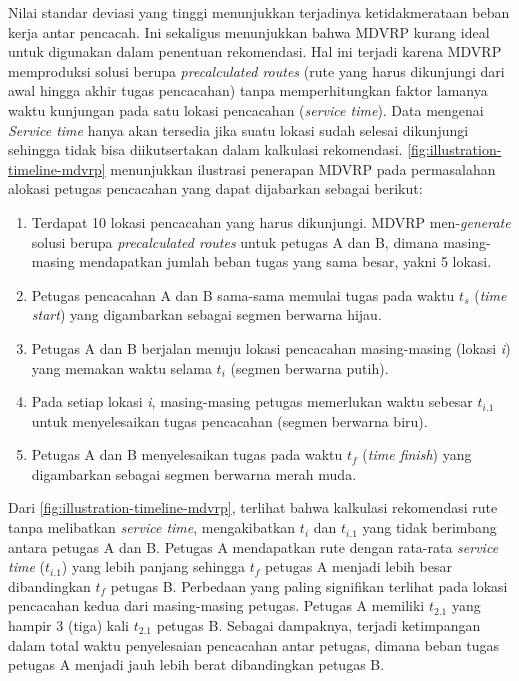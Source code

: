 Nilai standar deviasi yang tinggi menunjukkan terjadinya ketidakmerataan beban kerja antar pencacah. Ini sekaligus menunjukkan bahwa MDVRP kurang ideal untuk digunakan dalam penentuan rekomendasi. Hal ini terjadi karena MDVRP memproduksi solusi berupa \textit{precalculated routes} (rute yang harus dikunjungi dari awal hingga akhir tugas pencacahan) tanpa memperhitungkan faktor lamanya waktu kunjungan pada satu lokasi pencacahan (\textit{service time}). Data mengenai \textit{Service time} hanya akan tersedia jika suatu lokasi sudah selesai dikunjungi sehingga tidak bisa diikutsertakan dalam kalkulasi rekomendasi. \autoref{fig:illustration-timeline-mdvrp} menunjukkan ilustrasi penerapan MDVRP pada permasalahan alokasi petugas pencacahan yang dapat dijabarkan sebagai berikut:
\begin{enumerate}
	\item Terdapat 10 lokasi pencacahan yang harus dikunjungi. MDVRP men-\textit{generate} solusi berupa \textit{precalculated routes} untuk petugas A dan B, dimana masing-masing mendapatkan jumlah beban tugas yang sama besar, yakni 5 lokasi. 
	\item Petugas pencacahan A dan B sama-sama memulai tugas pada waktu $t_{s}$ (\textit{time start}) yang digambarkan sebagai segmen berwarna hijau.
	\item Petugas A dan B berjalan menuju lokasi pencacahan masing-masing (lokasi \textit{i}) yang memakan waktu selama $t_{i}$ (segmen berwarna putih). 
	\item Pada setiap lokasi \textit{i}, masing-masing petugas memerlukan waktu sebesar $t_{i.1}$ untuk menyelesaikan tugas pencacahan (segmen berwarna biru). 
	\item Petugas A dan B menyelesaikan tugas pada waktu $t_{f}$ (\textit{time finish}) yang digambarkan sebagai segmen berwarna merah muda. 
\end{enumerate}

Dari \autoref{fig:illustration-timeline-mdvrp}, terlihat bahwa kalkulasi rekomendasi rute tanpa melibatkan \textit{service time}, mengakibatkan $t_{i}$ dan $t_{i.1}$ yang tidak berimbang antara petugas A dan B. Petugas A mendapatkan rute dengan rata-rata \textit{service time} ($t_{i.1}$) yang lebih panjang sehingga $t_{f}$ petugas A menjadi lebih besar dibandingkan $t_{f}$ petugas B. Perbedaan yang paling signifikan terlihat pada lokasi pencacahan kedua dari masing-masing petugas. Petugas A memiliki $t_{2.1}$ yang hampir 3 (tiga) kali $t_{2.1}$ petugas B. Sebagai dampaknya, terjadi ketimpangan dalam total waktu penyelesaian pencacahan antar petugas, dimana beban tugas petugas A menjadi jauh lebih berat dibandingkan petugas B. 

